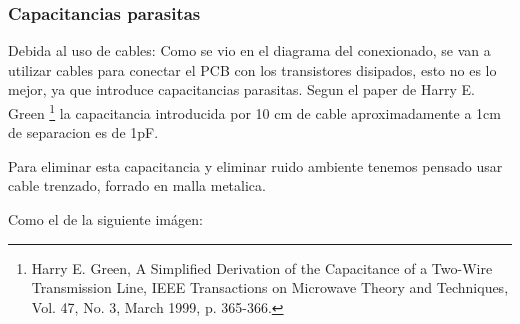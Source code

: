 \documentclass[a4paper,12pt,twoside]{article}
\begin{document}
















\subsubsection{Capacitancias parasitas}

Debida al uso de cables:
\newline
\newline
Como se vio en el diagrama del conexionado, se van a utilizar cables para conectar el PCB con los transistores disipados, esto no es lo mejor, ya que introduce capacitancias parasitas. Segun el paper de Harry E. Green \footnote{Harry E. Green, A Simplified Derivation of the Capacitance of a Two-Wire Transmission Line, IEEE Transactions on Microwave Theory and Techniques, Vol. 47, No. 3, March 1999, p. 365-366.} la capacitancia introducida por 10 cm de cable aproximadamente a 1cm de separacion es de 1pF.

Para eliminar esta capacitancia y eliminar ruido ambiente tenemos pensado usar cable trenzado, forrado en malla metalica.

Como el de la siguiente imágen:
\end{document}
